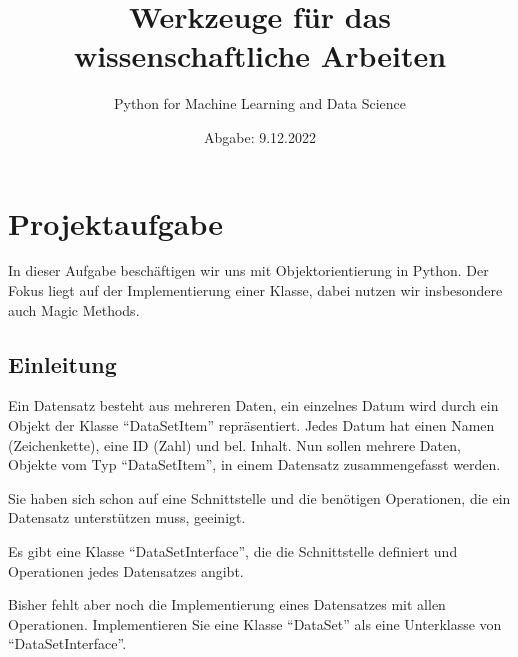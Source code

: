 \documentclass[
10pt,
a4paper
parskip=full
]{scrartcl}
\begin{document}
    \title{Werkzeuge für das wissenschaftliche Arbeiten}
    \author{Python for Machine Learning and Data Science}
    \date{Abgabe: 9.12.2022}
    \maketitle

    \tableofcontents

    \section{Projektaufgabe}
    In dieser Aufgabe beschäftigen wir uns mit Objektorientierung in Python. Der Fokus liegt auf der Implementierung einer Klasse, dabei nutzen wir insbesondere auch Magic Methods.

        \subsection{Einleitung}
        Ein Datensatz besteht aus mehreren Daten, ein einzelnes Datum wird durch ein 	Objekt der Klasse "`DataSetItem"' repräsentiert. Jedes Datum hat einen Namen 	(Zeichenkette), eine ID (Zahl) und bel. Inhalt. Nun sollen mehrere Daten, Objekte 	vom Typ "`DataSetItem"', in einem Datensatz zusammengefasst werden. 

        Sie haben sich schon auf eine Schnittstelle und die benötigen Operationen, die 	ein Datensatz unterstützen muss, geeinigt. 
        
        Es gibt eine Klasse "`DataSetInterface"', die die Schnittstelle definiert und 			Operationen jedes Datensatzes angibt. 
        
        Bisher fehlt aber noch die Implementierung eines Datensatzes mit allen 			Operationen. Implementieren Sie eine Klasse "`DataSet"' als eine Unterklasse 		von "`DataSetInterface"'.
\end{document}
